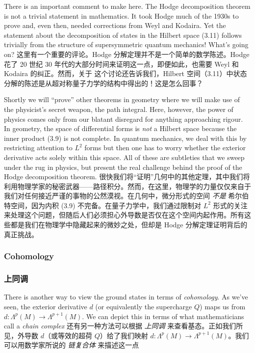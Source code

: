 \documentclass{article}
\begin{document}
\begin{paracol}{2}
There is an important comment to make here. The Hodge decomposition theorem is not a trivial statement in mathematics. It took Hodge much of the 1930s to prove and, even then, needed corrections from Weyl and Kodaira. Yet the statement about the decomposition of states in the Hilbert space (3.11) follows trivially from the structure of supersymmetric quantum mechanics! What’s going on?
\switchcolumn
这里有一个重要的评论。Hodge 分解定理并不是一个简单的数学陈述。Hodge 花了 20 世纪 30 年代的大部分时间来证明这一点，即便如此，也需要 Weyl 和 Kodaira 的纠正。然而，关于 这个讨论还告诉我们，Hilbert 空间（3.11）中状态分解的陈述是从超对称量子力学的结构中得出的！这是怎么回事？
\switchcolumn*

Shortly we will “prove” other theorems in geometry where we will make use of the physicist’s secret weapon, the path integral. Here, however, the power of physics comes only from our blatant disregard for anything approaching rigour. In geometry, the space of diﬀerential forms is \textit{not} a Hilbert space because the inner product (3.9) is not complete. In quantum mechanics, we deal with this by restricting attention to $L^2$ forms but then one has to worry whether the exterior derivative acts solely within this space. All of these are subtleties that we sweep under the rug in physics, but present the real challenge behind the proof of the Hodge decomposition theorem.
\switchcolumn
很快我们将“证明”几何中的其他定理，其中我们将利用物理学家的秘密武器——路径积分。然而，在这里，物理学的力量仅仅来自于我们对任何接近严谨的事物的公然漠视。在几何中，微分形式的空间 \textit{不是} 希尔伯特空间，因为内积 (3.9) 不完备。在量子力学中，我们通过限制对 $L^2$ 形式的关注来处理这个问题，但随后人们必须担心外导数是否仅在这个空间内起作用。所有这些都是我们在物理学中隐藏起来的微妙之处，但却是 Hodge 分解定理证明背后的真正挑战。
\switchcolumn*

\subsubsection*{Cohomology}
\switchcolumn
\subsubsection*{上同调}
\switchcolumn*

There is another way to view the ground states in terms of \textit{cohomology}. As we’ve seen, the exterior derivative $d$ (or equivalently the supercharge $Q$) maps us from $d: \Lambda^p(M) \to \Lambda^{p + 1}(M)$. We can depict this in terms of what mathematicians call a \textit{chain complex}
\switchcolumn
还有另一种方法可以根据 \textit{上同调} 来查看基态。正如我们所见，外导数 $d$（或等效的超荷 $Q$）给了我们映射 $d: \Lambda^p(M) \to \Lambda^{p + 1}(M)$。我们可以用数学家所说的 \textit{链复合体} 来描述这一点
\end{paracol}
\end{document}
